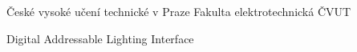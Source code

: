 

  {České vysoké učení technické v Praze}
   {Fakulta elektrotechnická ČVUT}

  {Digital Addressable Lighting Interface}


